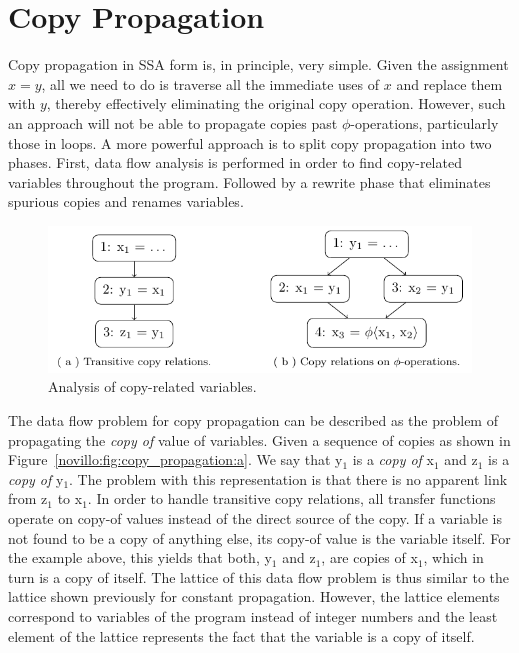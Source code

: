 \section{Copy Propagation}
\label{novillo:sec:copy-prop}

Copy propagation in SSA form is, in principle, very simple.  Given the
assignment \linebreak $x = y$, all we need to do is traverse all the immediate
uses of $x$ and replace them with $y$, thereby effectively eliminating the
original copy operation. However, such an approach will not be able to propagate
copies past $\phi$-operations, particularly those in loops. A more powerful
approach is to split copy propagation into two phases. First, data flow analysis
is performed in order to find copy-related variables throughout the program.
Followed by a rewrite phase that eliminates spurious copies and renames
variables.

\begin{figure}[b!]
  \begin{center}
    \includegraphics{copy_propagation}
    \subfigure{\label{novillo:fig:copy_propagation:a}}
    \subfigure{\label{novillo:fig:copy_propagation:b}}
  \end{center}
  \vspace{-1em}
  \caption{Analysis of copy-related variables.}
  \label{novillo:fig:copy_propagation}
\end{figure}

The data flow problem for copy propagation can be described as the problem of
propagating the \textit{copy of} value of variables.  Given a sequence of
copies as shown in Figure~\ref{novillo:fig:copy_propagation:a}. We say that
y$_1$ is a \textit{copy of} x$_1$ and z$_1$ is a \textit{copy of} y$_1$.  The
problem with this representation is that there is no apparent link from z$_1$ to
x$_1$.  In order to handle transitive copy relations, all transfer functions
operate on copy-of values instead of the direct source of the copy.  If a
variable is not found to be a copy of anything else, its copy-of value is the
variable itself. For the example above, this yields that both, y$_1$ and z$_1$,
are copies of x$_1$, which in turn is a copy of itself. The lattice of this data
flow problem is thus similar to the lattice shown previously for constant
propagation. However, the lattice elements correspond to variables of the
program instead of integer numbers and the least element of the lattice
represents the fact that the variable is a copy of itself.

